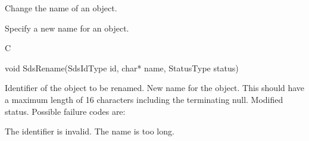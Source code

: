 \begin{manroutinedescription}
      Change the name of an object.

      Specify a new name for an object.

      C

      void SdsRename(SdsIdType id, char* name, StatusType {\mantt{*}} {} status)
 
\begin{manparametertable}
  Identifier of the object to be %
renamed.
 New name for the object. This %
should
                            have a maximum length of 16 characters including
                            the terminating null.
 Modified status. Possible %
failure codes are:
\end{manparametertable}
\begin{mantwocolumntable}
The identifier is invalid.
The name is too long.
\end{mantwocolumntable}
\end{manroutinedescription}
